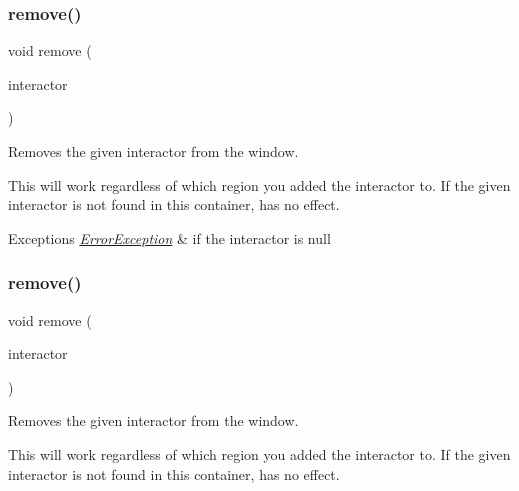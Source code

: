 \subsubsection{\texorpdfstring{remove()}{remove()}\hspace{0.1cm}{\footnotesize\ttfamily [1/4]}}
{\footnotesize\ttfamily void remove (\begin{DoxyParamCaption}\item[{\mbox{\hyperlink{classGInteractor}{G\+Interactor}} $\ast$}]{interactor }\end{DoxyParamCaption})\hspace{0.3cm}{\ttfamily [virtual]}}



Removes the given interactor from the window. 

This will work regardless of which region you added the interactor to. If the given interactor is not found in this container, has no effect. 
\begin{DoxyExceptions}{Exceptions}
{\em \mbox{\hyperlink{classErrorException}{Error\+Exception}}} & if the interactor is null \\
\hline
\end{DoxyExceptions}
\mbox{\label{classGWindow_ade2376c458ac401a0bd2dbe44271509e}} 
\subsubsection{\texorpdfstring{remove()}{remove()}\hspace{0.1cm}{\footnotesize\ttfamily [2/4]}}
{\footnotesize\ttfamily void remove (\begin{DoxyParamCaption}\item[{\mbox{\hyperlink{classGInteractor}{G\+Interactor}} \&}]{interactor }\end{DoxyParamCaption})\hspace{0.3cm}{\ttfamily [virtual]}}



Removes the given interactor from the window. 

This will work regardless of which region you added the interactor to. If the given interactor is not found in this container, has no effect. \mbox{\label{classGWindow_afc8bff4a24e05c696cbe4cba7403e558}} 
